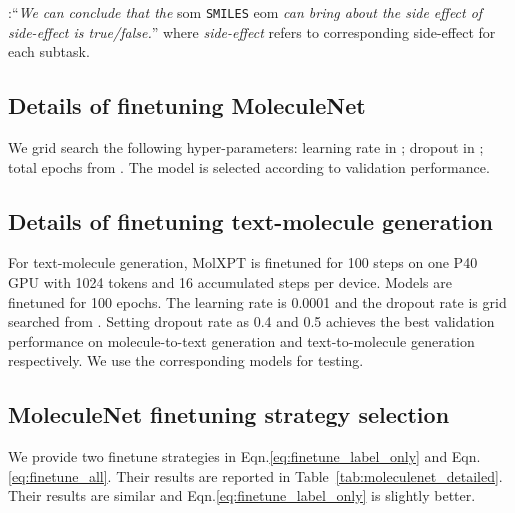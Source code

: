 \documentclass[11pt]{article}
\newcommand{\ourM}{MolXPT}
\newcommand{\som}{som}
\newcommand{\eom}{eom}
\begin{document}
:``{\em We can conclude that the }\som{} \texttt{SMILES} \eom{} {\em can bring about the side effect of side-effect is true/false.}'' where {\em side-effect} refers to corresponding side-effect for each subtask.

\subsection{Details of finetuning MoleculeNet}
\label{sec:molnet_hyper}
We grid search the following hyper-parameters: learning rate in ; dropout in ; total epochs from . The model is selected according to validation performance.

\subsection{Details of finetuning text-molecule generation}
For text-molecule generation, \ourM{} is finetuned for 100 steps on one P40 GPU with 1024 tokens and 16 accumulated steps per device. Models are finetuned for 100 epochs.
The learning rate is 0.0001 and the dropout rate is grid searched from . Setting dropout rate as 0.4 and 0.5 achieves the best validation performance on molecule-to-text generation and text-to-molecule generation respectively. We use the corresponding models for testing.

\subsection{MoleculeNet finetuning strategy selection}
\label{sec:moleculenet_detailed_result}
We provide two finetune strategies in  Eqn.\eqref{eq:finetune_label_only} and Eqn.\eqref{eq:finetune_all}. Their results are reported in Table~\ref{tab:moleculenet_detailed}. Their results are similar and Eqn.\eqref{eq:finetune_label_only} is slightly better.



\begin{table*}[!htbp]
\centering
{}
\caption{Comparison of different finetuning strategies on MoleculeNet. ``Dev'' and ``Test'' denote validation set and test set respectively. Subscripts represent finetuning full prompts (Eqn.\eqref{eq:finetune_all}) or tags only respectively (Eqn.\eqref{eq:finetune_label_only}). The evaluation metric is ROC-AUC. }
\label{tab:moleculenet_detailed}
\end{table*}
\end{document}
